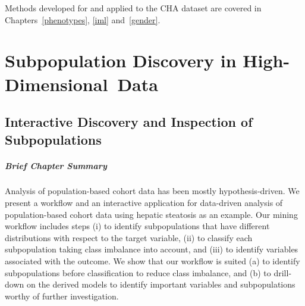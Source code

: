 \documentclass[
  oneside]{book}
\newenvironment{infobox}[1]
  {
  \begin{chapter-summary}
  }
  {
  \end{chapter-summary}
  }
\begin{document}
Methods developed for and applied to the CHA dataset are covered in Chapters~\ref{phenotypes}, \ref{iml} and~\ref{gender}.

\hypertarget{part-subpopulation-discovery-in-high-dimensional-data}{%
\part{Subpopulation Discovery in High-Dimensional~Data}\label{part-subpopulation-discovery-in-high-dimensional-data}}

\hypertarget{imm}{%
\chapter{Interactive Discovery and Inspection of Subpopulations}\label{imm}}

\begin{infobox}{tasks.pdf}

\hypertarget{brief-chapter-summary}{%
\subsubsection*{Brief Chapter Summary}\label{brief-chapter-summary}}

Analysis of population-based cohort data has been mostly hypothesis-driven.
We present a workflow and an interactive application for data-driven analysis of population-based cohort data using hepatic steatosis as an example.
Our mining workflow includes steps (i) to identify subpopulations that have different distributions with respect to the target variable, (ii) to classify each subpopulation taking class imbalance into account, and (iii) to identify variables associated with the outcome.
We show that our workflow is suited (a) to identify subpopulations before classification to reduce class imbalance, and (b) to drill-down on the derived models to identify important variables and subpopulations worthy of further investigation.

\end{infobox}
\end{document}
